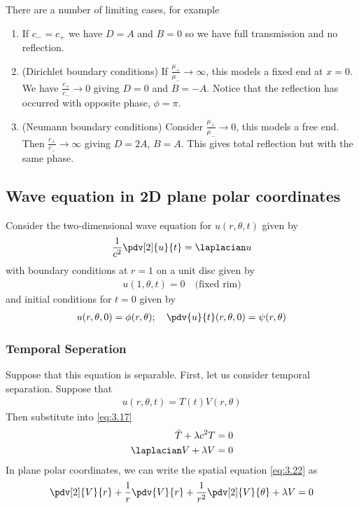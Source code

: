 There are a number of limiting cases, for example
\begin{enumerate}
	\item If $c_- = c_+$ we have $D = A$ and $B = 0$ so we have full transmission and no reflection.
	\item (Dirichlet boundary conditions) If $\frac{\mu_+}{\mu_-} \to \infty$, this models a fixed end at $x = 0$.
	      We have $\frac{c_+}{c_-} \to 0$ giving $D = 0$ and $B = -A$.
	      Notice that the reflection has occurred with opposite phase, $\phi = \pi$.
	\item (Neumann boundary conditions) Consider $\frac{\mu_+}{\mu_-} \to 0$, this models a free end.
	      Then $\frac{c_+}{c_-} \to \infty$ giving $D = 2A$, $B = A$.
	      This gives total reflection but with the same phase.
\end{enumerate}

\subsection{Wave equation in 2D plane polar coordinates}
Consider the two-dimensional wave equation for $u(r,\theta,t)$ given by
\begin{align} \label{eq:3.17}
	\frac{1}{c^2} \pdv[2]{u}{t} = \laplacian u
\end{align}
with boundary conditions at $r = 1$ on a unit disc given by
\begin{align} \label{eq:3.18}
	u(1,\theta,t) = 0 \quad \text{(fixed rim)}
\end{align}
and initial conditions for $t = 0$ given by
\begin{align} \label{eq:3.19}
	u(r,\theta,0) = \phi(r,\theta);\quad \pdv{u}{t}(r,\theta,0) = \psi(r,\theta)
\end{align}

\subsubsection{Temporal Seperation}
Suppose that this equation is separable.
First, let us consider temporal separation.
Suppose that
\begin{align} \label{eq:3.20}
	u(r,\theta,t) = T(t) V(r,\theta)
\end{align}
Then substitute into \cref{eq:3.17}
\begin{align}
	\ddot T + \lambda c^2 T &= 0 \label{eq:3.21} \\
	\laplacian V + \lambda V &= 0 \label{eq:3.22}
\end{align}
In plane polar coordinates, we can write the spatial equation \cref{eq:3.22} as
\begin{align*}
	\pdv[2]{V}{r} + \frac{1}{r} \pdv{V}{r} + \frac{1}{r^2}\pdv[2]{V}{\theta} + \lambda V = 0
\end{align*}
